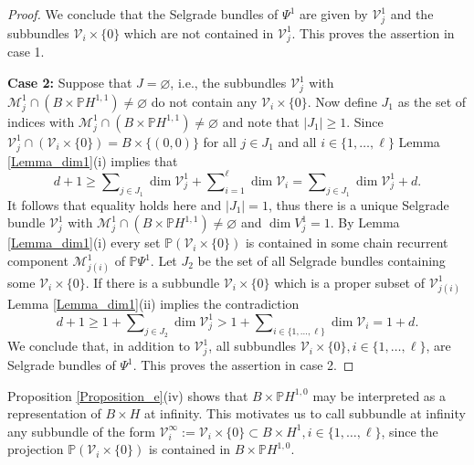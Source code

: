 \begin{proof}
		We conclude that the Selgrade bundles of $\Psi^{1}$ are given by
		$\mathcal{V}_{j}^{1}$ and the subbundles $\mathcal{V}_{i}\times\{0\}$ which
		are not contained in $\mathcal{V}_{j}^{1}$. This proves the assertion in case 1.
		
		\textbf{Case 2:} Suppose that $J=\varnothing$, i.e., the subbundles
		$\mathcal{V}_{j}^{1}$ with $\mathcal{M}_{j}^{1}\cap\left(  B\times
		\mathbb{P}H^{1,1}\right)  \not =\varnothing$ do not contain any $\mathcal{V}%
		_{i}\times\{0\}$. Now define $J_{1}$ as the set of indices with $\mathcal{M}%
		_{j}^{1}\cap\left(  B\times\mathbb{P}H^{1,1}\right)  \not =\varnothing$ and
		note that $\left\vert J_{1}\right\vert \geq1$. Since $\mathcal{V}_{j}^{1}%
		\cap\left(  \mathcal{V}_{i}\times\{0\}\right)  =B\times\{(0,0)\}$ for all
		$j\in J_{1}$ and all $i\in\{1,\ldots,\ell\}$ Lemma \ref{Lemma_dim1}(i) implies
		that
		\[
		d+1\geq\sum\nolimits_{j\in J_{1}}\dim\mathcal{V}_{j}^{1}+\sum\nolimits_{i=1}%
		^{\ell}\dim\mathcal{V}_{i}=\sum\nolimits_{j\in J_{1}}\dim\mathcal{V}_{j}%
		^{1}+d.
		\]
		It follows that equality holds here and $\left\vert J_{1}\right\vert =1$, thus
		there is a unique Selgrade bundle $\mathcal{V}_{j}^{1}$ with $\mathcal{M}%
		_{j}^{1}\cap\left(  B\times\mathbb{P}H^{1,1}\right)  \not =\varnothing$ and
		$\dim V_{j}^{1}=1$. By Lemma \ref{Lemma_dim1}(i) every set $\mathbb{P}\left(
		\mathcal{V}_{i}\times\{0\}\right)  $ is contained in some chain recurrent
		component $\mathcal{M}_{j(i)}^{1}$ of $\mathbb{P}\Psi^{1}$. Let $J_{2}$ be the
		set of all Selgrade bundles containing some $\mathcal{V}_{i}\times\{0\}$. If
		there is a subbundle $\mathcal{V}_{i}\times\{0\}$ which is a proper subset of
		$\mathcal{V}_{j(i)}^{1}$ Lemma \ref{Lemma_dim1}(ii) implies the contradiction%
		\[
		d+1\geq1+\sum\nolimits_{j\in J_{2}}\dim\mathcal{V}_{j}^{1}>1+\sum
		\nolimits_{i\in\{1,\ldots,\ell\}}\dim\mathcal{V}_{i}=1+d.
		\]
		We conclude that, in addition to $\mathcal{V}_{j}^{1}$, all subbundles
		$\mathcal{V}_{i}\times\{0\},i\in\{1,\ldots,\ell\}$, are Selgrade bundles of
		$\Psi^{1}$. This proves the assertion in case 2.
	\end{proof}
	
	Proposition \ref{Proposition_e}(iv) shows that $B\times\mathbb{P}H^{1,0}$ may
	be interpreted as a representation of $B\times H$ at infinity. This motivates
	us to call subbundle at infinity any subbundle of the form $\mathcal{V}%
	_{i}^{\infty}:=\mathcal{V}_{i}\times\{0\}\subset B\times H^{1},i\in
	\{1,\ldots,\ell\}$, since the projection $\mathbb{P}\left(  \mathcal{V}%
	_{i}\times\{0\}\right)  $ is contained in $B\times\mathbb{P}H^{1,0}$.
	
